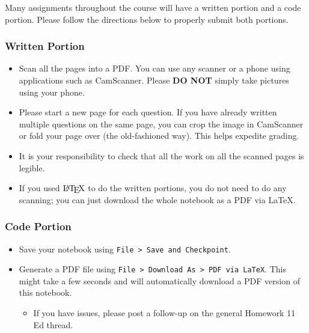 \documentclass[11pt]{article}
\providecommand{\tightlist}{%
      \setlength{\itemsep}{0pt}\setlength{\parskip}{0pt}}
\let\Oldlatex\LaTeX
\renewcommand{\LaTeX}{\textrm{\Oldlatex}}
\begin{document}
Many assignments throughout the course will have a written portion and a
code portion. Please follow the directions below to properly submit both
portions.

\hypertarget{written-portion}{%
\subsubsection{Written Portion}\label{written-portion}}

\begin{itemize}
\tightlist
\item
  Scan all the pages into a PDF. You can use any scanner or a phone
  using applications such as CamScanner. Please \textbf{DO NOT} simply
  take pictures using your phone.
\item
  Please start a new page for each question. If you have already written
  multiple questions on the same page, you can crop the image in
  CamScanner or fold your page over (the old-fashioned way). This helps
  expedite grading.
\item
  It is your responsibility to check that all the work on all the
  scanned pages is legible.
\item
  If you used \(\LaTeX\) to do the written portions, you do not need to
  do any scanning; you can just download the whole notebook as a PDF via
  LaTeX.
\end{itemize}

\hypertarget{code-portion}{%
\subsubsection{Code Portion}\label{code-portion}}

\begin{itemize}
\tightlist
\item
  Save your notebook using
  \texttt{File\ \textgreater{}\ Save\ and\ Checkpoint}.
\item
  Generate a PDF file using
  \texttt{File\ \textgreater{}\ Download\ As\ \textgreater{}\ PDF\ via\ LaTeX}.
  This might take a few seconds and will automatically download a PDF
  version of this notebook.

  \begin{itemize}
  \tightlist
  \item
    If you have issues, please post a follow-up on the general Homework
    11 Ed thread.
  \end{itemize}
\end{itemize}
\end{document}
